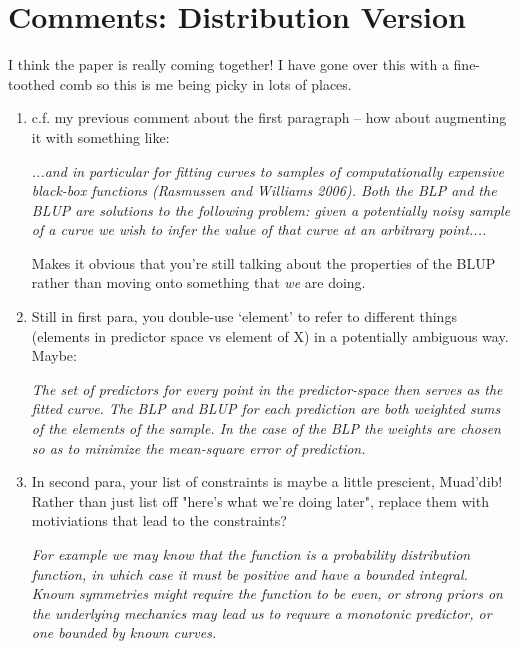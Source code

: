 \documentclass[]{article}
\begin{document}
	\section{Comments: Distribution Version}

		I think the paper is really coming together! I have gone over this with a fine-toothed comb so this is me being picky in lots of places.

		\begin{enumerate}
			\item c.f. my previous comment about the first paragraph -- how about augmenting it with something like:
			
			{\it ...and in particular for fitting curves to samples of computationally expensive black-box functions (Rasmussen and Williams 2006). {\color{red} Both the BLP and the BLUP are solutions to the following problem: g}iven a potentially noisy sample of a curve we wish to infer the value of that curve at an arbitrary point.... }

			Makes it obvious that you're still talking about the properties of the BLUP rather than moving onto something that \textit{we} are doing.

			\item Still in first para, you double-use `element' to refer to different things (elements in predictor space vs element of X) in a potentially ambiguous way. Maybe:
			
			{\it The set of predictors for every {\color{red} point in the predictor-space} then serves as the fitted curve. The BLP and BLUP for each {\color{red} prediction} are both weighted sums of the elements of the sample. In the case of the BLP the weights are chosen so as to minimize the mean-square error of prediction.}

			\item In second para, your list of constraints is maybe a little prescient, Muad'dib! Rather than just list off "here's what we're doing later", replace them with motiviations that lead to the constraints?
			
			{\it For example we may know that the function is a probability distribution function, in which case it must be positive and have a bounded integral. Known symmetries might require the function to be even, or strong priors on the underlying mechanics may lead us to requure a monotonic predictor, or one bounded by known curves.}


\end{enumerate}
\end{document}
